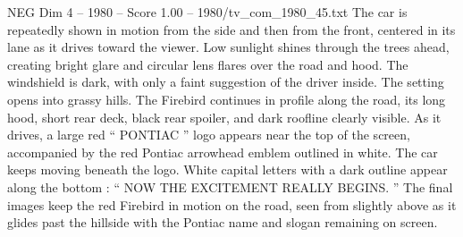 \begin{textsample}{NEG Dim 4 – 1980 – Score 1.00 – 1980/tv\_com\_1980\_45.txt}
The car is repeatedly shown in motion from the side and then from the front, centered in its lane as it drives toward the viewer.
Low sunlight shines through the trees ahead, creating bright glare and circular lens flares over the road and hood.
The windshield is dark, with only a faint suggestion of the driver inside.
The setting opens into grassy hills.
The Firebird continues in profile along the road, its long hood, short rear deck, black rear spoiler, and dark roofline clearly visible.
As it drives, a large red “ PONTIAC ” logo appears near the top of the screen, accompanied by the red Pontiac arrowhead emblem outlined in white.
The car keeps moving beneath the logo.
White capital letters with a dark outline appear along the bottom : “ NOW THE EXCITEMENT REALLY BEGINS. ” The final images keep the red Firebird in motion on the road, seen from slightly above as it glides past the hillside with the Pontiac name and slogan remaining on screen.

\end{textsample}
